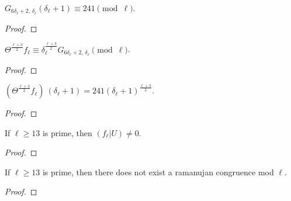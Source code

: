 \begin{theorem}
  \label{thm:G_delta_add_one}
  \leanok
  $G_{6\delta_\ell + 2, \, \delta_\ell} (\delta_\ell + 1) \equiv 241 \pmod \ell$.
\end{theorem}
\begin{proof}
  \leanok
\end{proof}

\begin{theorem}
  \label{thm:Theta_l_add_three_div_two}
  \leanok

  $\Theta^{\frac{\ell + 3}{2}} f_\ell \equiv \delta_\ell ^ {\frac{\ell + 3}{2}} G_{6\delta_\ell + 2, \, \delta_\ell} \pmod \ell$.

\end{theorem}
\begin{proof}
  \leanok
\end{proof}


\begin{theorem}
  \label{thm:Theta_l_add_three_div_two_eq_241}
  \leanok
  $(\Theta^{\frac{\ell + 3}{2}} f_\ell) \: (\delta_\ell + 1) = 241 (\delta_\ell + 1)^{\frac{\ell + 3}{2}}$.
\end{theorem}
\begin{proof}
  \leanok
\end{proof}
 

\begin{theorem}
  \label{thm:flu_ne_zero}
  \leanok
  If $\ell \ge 13$ is prime, then $(f_\ell | U) \neq 0.$

\end{theorem}
\begin{proof}
  \leanok
\end{proof}

\begin{theorem}
  \label{thm:MainResult}
  \leanok
  If $\ell \ge 13$ is prime, then there does not exist a ramanujan congruence mod $\ell$.
\end{theorem}
\begin{proof}
  \leanok
\end{proof}






